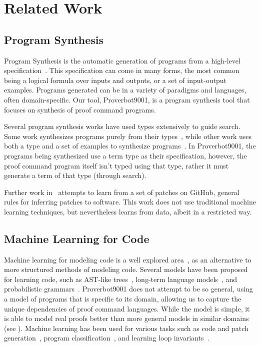 \documentclass[sigplan,screen]{acmart}
\newcommand{\name}{Proverbot9001\xspace}
\renewcommand{\>}{\quad}
\begin{document}
 \section{Related Work}
\label{sec:relatedwork}

\subsection{Program Synthesis}
Program Synthesis is the automatic generation of programs
  from a high-level specification~\cite{dimensions-synthesis}.
This specification can come in many forms,
  the most common being a logical formula over inputs and outputs,
  or a set of input-output examples.
Programs generated can be in a variety of paradigms and languages,
  often domain-specific.
Our tool, \name{}, is a program synthesis tool
  that focuses on synthesis of proof command programs.

Several program synthesis works have used types extensively
  to guide search.
Some work synthesizes programs purely from their types~\cite{complete-completions},
  while other work uses both a type and a set of examples to synthesize programs~\cite{type-and-example, example-and-type}.
In \name{}, the programs being synthesized use a term type as their specification,
  however, the proof command program itself isn't typed using that type,
  rather it must generate a term of that type (through search).

Further work in~\cite{patch-generation} attempts to learn from a set of patches on GitHub,
  general rules for inferring patches to software.
This work does not use traditional machine learning techniques,
  but nevertheless learns from data, albeit in a restricted way.

\subsection{Machine Learning for Code}
Machine learning for modeling code is a well explored area~\cite{survey-ml-for-code},
  as an alternative to more structured methods of modeling code.
Several models have been proposed for learning code,
  such as AST-like trees~\cite{tree-models},
  long-term language models~\cite{deep-code-model},
  and probabilistic grammars~\cite{phog}.
\name{} does not attempt to be so general,
  using a model of programs that is specific to its domain,
  allowing us to capture the unique dependencies of proof command languages.
While the model is simple,
  it is able to model real proofs better than more general models in similar domains
  (see ).
Machine learning has been used for various tasks such as
  code and patch generation~\cite{survey-ml-for-code, phog, deep-code-model},
  program classification~\cite{tree-models},
  and learning loop invariants~\cite{learning-invariants}.
\end{document}
